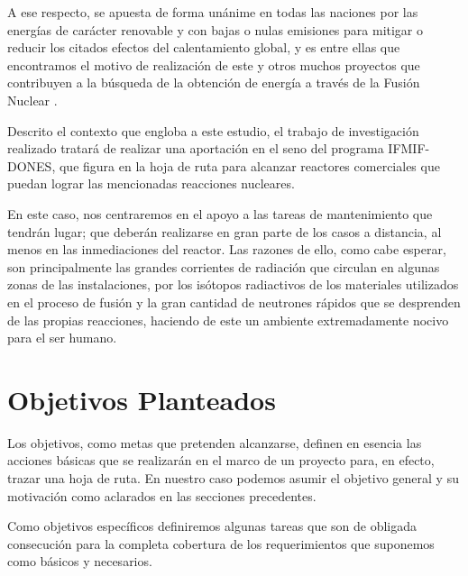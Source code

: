 A ese respecto, se apuesta de forma unánime en todas las naciones por las energías de carácter renovable y con bajas o nulas emisiones para mitigar o reducir los citados efectos del calentamiento global, y es entre ellas que encontramos el motivo de realización de este y otros muchos proyectos que contribuyen a la búsqueda de la obtención de energía a través de la Fusión Nuclear . 

Descrito el contexto que engloba a este estudio, el trabajo de investigación realizado tratará de realizar una aportación en el seno del programa IFMIF-DONES, que figura en la hoja de ruta para alcanzar reactores comerciales que puedan lograr las mencionadas reacciones nucleares.

En este caso, nos centraremos en el apoyo a las tareas de mantenimiento que tendrán lugar; que deberán realizarse en gran parte de los casos a distancia, al menos en las inmediaciones del reactor. Las razones de ello, como cabe esperar, son principalmente las grandes corrientes de radiación que circulan en algunas zonas de las instalaciones, por los isótopos radiactivos de los materiales utilizados en el proceso de fusión y la gran cantidad de neutrones rápidos que se desprenden de las propias reacciones, haciendo de este un ambiente extremadamente nocivo para el ser humano.

\section{Objetivos Planteados}
Los objetivos, como metas que pretenden alcanzarse, definen en esencia las acciones básicas que se realizarán en el marco de un proyecto para, en efecto, trazar una hoja de ruta. En nuestro caso podemos asumir el objetivo general y su motivación como  aclarados en las secciones precedentes.

Como objetivos específicos definiremos algunas tareas que son de obligada consecución para la completa cobertura de los requerimientos que suponemos como básicos y necesarios.

